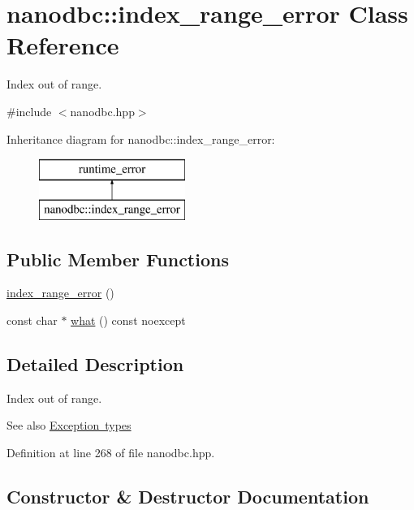 \hypertarget{classnanodbc_1_1index__range__error}{}\section{nanodbc\+::index\+\_\+range\+\_\+error Class Reference}
\label{classnanodbc_1_1index__range__error}


Index out of range.  




{\ttfamily \#include $<$nanodbc.\+hpp$>$}

Inheritance diagram for nanodbc\+::index\+\_\+range\+\_\+error\+:\begin{figure}[H]
\begin{center}
\leavevmode
\includegraphics[height=2.000000cm]{classnanodbc_1_1index__range__error}
\end{center}
\end{figure}
\subsection*{Public Member Functions}
\begin{DoxyCompactItemize}
\item 
\mbox{\hyperlink{classnanodbc_1_1index__range__error_a70574ec7f027c4f8767260391f2452b3}{index\+\_\+range\+\_\+error}} ()
\item 
const char $\ast$ \mbox{\hyperlink{classnanodbc_1_1index__range__error_a3b1ef5a9d3faa236c80c4041a8c74f4e}{what}} () const noexcept
\end{DoxyCompactItemize}


\subsection{Detailed Description}
Index out of range. 

\begin{DoxySeeAlso}{See also}
\mbox{\hyperlink{group__exceptions}{Exception types}} 
\end{DoxySeeAlso}


Definition at line 268 of file nanodbc.\+hpp.



\subsection{Constructor \& Destructor Documentation}
\mbox{\label{classnanodbc_1_1index__range__error_a70574ec7f027c4f8767260391f2452b3}} 
